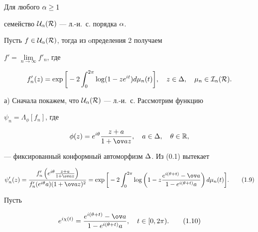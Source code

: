\begin{thm}


Для любого $\alpha\ge1$


семейство $\cal U_\alpha(R)$ --- л.-и.~с. порядка $\alpha$.


\end{thm}





\begin{pf}


Пусть $f\in\cal U_\alpha(R)$, тогда из oпределения 2 получаем


$f'=\lim\limits_{n\to\infty}f'_n$, где


$$


f_n'(z)=\exp\bigg[-2\int_0^{2\pi}\log(1-z\et)d\mu_n(t)\bigg], \quad z\in\De,


\quad \mu_n\in\cal I_\al(R).


$$





а) Сначала покажем, что $\cal U_\alpha(R)$ --- л.-и.~с. Рассмотрим функцию


$\psi_n=\Lambda_\phi[f_n]$, где


$$


\phi(z)=\ete\frac{z+a}{1+\ov az}, \quad a\in\De, \quad \te\in\R,


$$


--- фиксированный конформный автоморфизм $\Delta$. Из (0.1) вытекает


\begin{equation}


\psi'_n(z)=


\frac{f'_n\left(\ete\frac{z+a}{1+\ov az}\right)}


{f'_n(\ete a)(1+\ov az)^2}=


\exp\bigg[-2\int_0^{2\pi}\log\left(1-z\frac{e^{i(\te+t)}-\ov a}


{1-e^{i(\te+t)}a}\right)d\mu_n(t)\bigg]. \tag{1.9}


\end{equation}





Пусть


\begin{equation}


e^{i\chi(t)}=\frac{e^{i(\te+t)}-\ov a} {1-e^{i(\te+t)}a},


\quad t\in [0,2\pi). \tag{1.10}


\end{equation}



\end{pf}
